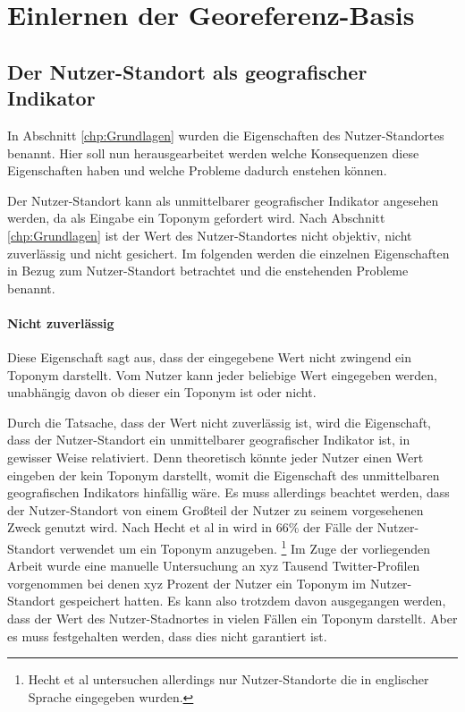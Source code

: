 \section{Einlernen der Georeferenz-Basis}
		
			\subsection{Der Nutzer-Standort als geografischer Indikator} \label{subsec:ulAsgeogInd} 

				In Abschnitt \ref{chp:Grundlagen} wurden die Eigenschaften des Nutzer-Standortes benannt.
				Hier soll nun herausgearbeitet werden welche Konsequenzen diese Eigenschaften haben und welche Probleme dadurch enstehen können.

				Der Nutzer-Standort kann als unmittelbarer geografischer Indikator angesehen werden, da als Eingabe ein Toponym gefordert wird.  
				Nach Abschnitt \ref{chp:Grundlagen} ist der Wert des Nutzer-Standortes nicht objektiv, nicht zuverlässig und nicht gesichert. 
				Im folgenden werden die einzelnen Eigenschaften in Bezug zum Nutzer-Standort betrachtet und die enstehenden Probleme benannt.
			
			\paragraph{Nicht zuverlässig} 
				
				Diese Eigenschaft sagt aus, dass der eingegebene Wert nicht zwingend ein Toponym darstellt.
				Vom Nutzer kann jeder beliebige Wert eingegeben werden, unabhängig davon ob dieser ein Toponym ist oder nicht.

				Durch die Tatsache, dass der Wert nicht zuverlässig ist, wird die Eigenschaft, dass der Nutzer-Standort ein unmittelbarer geografischer Indikator ist, in gewisser Weise relativiert.
				Denn theoretisch könnte jeder Nutzer einen Wert eingeben der kein Toponym darstellt, womit die Eigenschaft des unmittelbaren geografischen Indikators hinfällig wäre.
				Es muss allerdings beachtet werden, dass der Nutzer-Standort von einem Großteil der Nutzer zu seinem vorgesehenen Zweck genutzt wird.
				Nach Hecht et al in \cite{Hecht2011} wird in 66\%  der Fälle der Nutzer-Standort verwendet um ein Toponym anzugeben. \footnote{Hecht et al untersuchen allerdings nur Nutzer-Standorte die in englischer Sprache eingegeben wurden.}
				Im Zuge der vorliegenden Arbeit wurde eine manuelle Untersuchung an xyz Tausend Twitter-Profilen vorgenommen bei denen xyz Prozent der Nutzer ein Toponym im Nutzer-Standort gespeichert hatten.
				Es kann also trotzdem davon ausgegangen werden, dass der Wert des Nutzer-Stadnortes in vielen Fällen ein Toponym darstellt. 
				Aber es muss festgehalten werden, dass dies nicht garantiert ist.


